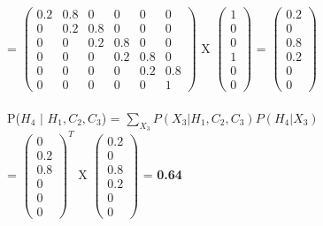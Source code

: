 \documentclass{article}
\begin{document}
\indent 
= $\left(\begin{array}{cccccc} 
        0.2 & 0.8 & 0 & 0 & 0 & 0 \\ 
        0 & 0.2 & 0.8 & 0 & 0 & 0 \\ 
        0 & 0 & 0.2 & 0.8 & 0 & 0 \\ 
        0 & 0 & 0 & 0.2 & 0.8 & 0 \\ 
        0 & 0 & 0 & 0 & 0.2 & 0.8 \\ 
        0 & 0 & 0 & 0 & 0 & 1
    \end{array}\right)$ X 
$\left(\begin{array}{c} 
        1 \\
        0 \\ 
        0 \\
        1 \\
        0 \\
        0
    \end{array}\right)$ 
= $\left(\begin{array}{c} 
        0.2 \\
        0 \\ 
        0.8 \\
        0.2 \\
        0 \\
        0
    \end{array}\right)$ \\ 
\\ 

P($H_4$ $\vert$ $H_1, C_2, C_3$) = $\sum_{X_3} P(X_3 \vert H_1, C_2, C_3) P(H_4 \vert X_3)$\\ 

\indent
= $\left(\begin{array}{c} 
        0 \\
        0.2 \\ 
        0.8 \\
        0 \\
        0 \\
        0
    \end{array}\right)^T$ X
$\left(\begin{array}{c} 
        0.2 \\
        0 \\ 
        0.8 \\
        0.2 \\
        0 \\
        0
    \end{array}\right)$ 
= \textbf{0.64}\\ 
\end{document}
